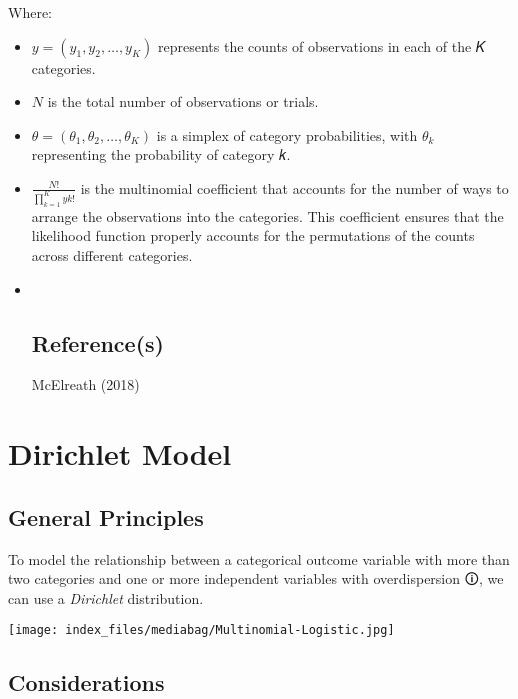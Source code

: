 \documentclass[
  letterpaper,
  DIV=11,
  numbers=noendperiod]{scrreprt}
\begin{document}
Where:

\begin{itemize}
\item
  \(y=(y_1, y_2,…,y_K)\) represents the counts of observations in each
  of the 𝐾 categories.
\item
  \(N\) is the total number of observations or trials.
\item
  \(θ=(θ_1,θ_2,…,θ_K)\) is a simplex of category probabilities, with
  \(θ_k\) representing the probability of category 𝑘.
\item
  \(\frac{N!}{∏^K_{k=1}yk!}\) is the multinomial coefficient that
  accounts for the number of ways to arrange the observations into the
  categories. This coefficient ensures that the likelihood function
  properly accounts for the permutations of the counts across different
  categories.
\item ~
  \section{Reference(s)}\label{references-8}

  McElreath (2018)
\end{itemize}


\chapter{Dirichlet Model}\label{dirichlet-model}

\section{General Principles}\label{general-principles-9}

To model the relationship between a categorical outcome variable with
more than two categories and one or more independent variables with
\label{overdispersion}{{overdispersion 🛈}}, we can use a
\emph{Dirichlet} distribution.

\texttt{[image: index\_files/mediabag/Multinomial-Logistic.jpg]}

\section{Considerations}\label{considerations-9}
\end{document}
